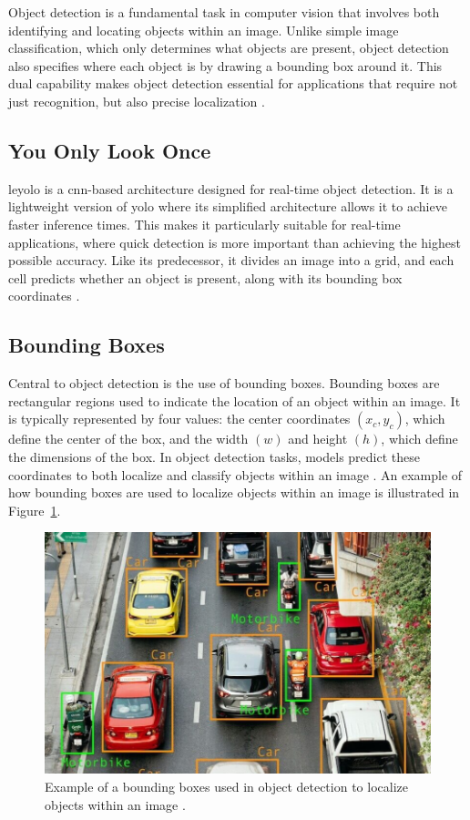 Object detection is a fundamental task in computer vision that involves both identifying and locating objects within an image. Unlike simple image classification, which only determines what objects are present, object detection also specifies where each object is by drawing a bounding box around it. This dual capability makes object detection essential for applications that require not just recognition, but also precise localization \cite{ibm:object-detection}. \\

\subsection{You Only Look Once}

\gls{leyolo} is a \gls{cnn}-based architecture designed for real-time object detection. It is a lightweight version of \gls{yolo} where its simplified architecture allows it to achieve faster inference times. This makes it particularly suitable for real-time applications, where quick detection is more important than achieving the highest possible accuracy. Like its predecessor, it divides an image into a grid, and each cell predicts whether an object is present, along with its bounding box coordinates \cite{openreview:leyolo}.\\

\subsection{Bounding Boxes}

Central to object detection is the use of bounding boxes. Bounding boxes are rectangular regions used to indicate the location of an object within an image. It is typically represented by four values: the center coordinates \((x_c, y_c)\), which define the center of the box, and the width \((w)\) and height \((h)\), which define the dimensions of the box. In object detection tasks, models predict these coordinates to both localize and classify objects within an image \cite{peopleforai:boundingbox}. An example of how bounding boxes are used to localize objects within an image is illustrated in Figure~\ref{fig:boundingbox}.

\begin{figure}[h!]
    \centering
    \includegraphics[width=0.60\linewidth]{figures/theory/image-recognition/bbox-example.png}
    \caption[Bounding box in object detection]{Example of a bounding boxes used in object detection to localize objects within an image \cite{peopleforai:boundingbox}.}
    \label{fig:boundingbox}
\end{figure}

